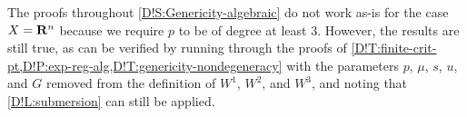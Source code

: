 \begin{remark}
\label{D!R:X-is-Rn-case}
  The proofs throughout \cref{D!S:Genericity-algebraic} do not work as-is for the case $X = \mathbf{R}^n$ because we require $p$ to be of degree at least $3$. However, the results are still true, as can be verified by running through the proofs of \cref{D!T:finite-crit-pt,D!P:exp-reg-alg,D!T:genericity-nondegeneracy} with the parameters $p$, $\mu$, $s$, $u$, and $G$ removed from the definition of $W^1$, $W^2$, and $W^3$, and noting that \cref{D!L:submersion} can still be applied.
\end{remark}

\printbibliography